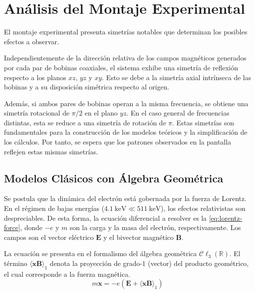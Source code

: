 \chapter{Análisis del Montaje Experimental}
\label{sec:analisis_montaje}

El montaje experimental presenta simetrías notables que determinan los
posibles efectos a observar.

Independientemente de la dirección relativa de los campos magnéticos
generados por cada par de bobinas coaxiales, el sistema exhibe una
simetría de reflexión respecto a los planos $xz$, $yz$ y $xy$.
Esto se debe a la simetría axial intrínseca de las bobinas y a su disposición
simétrica respecto al origen.

Además, si ambos pares de bobinas operan a la misma frecuencia, se
obtiene una simetría rotacional de $\pi/2$ en el plano $yz$.
En el caso general de frecuencias distintas, esta se reduce a una simetría de
rotación de $\pi$.
Estas simetrías son fundamentales para la construcción de los modelos teóricos
y la simplificación de los cálculos.
Por tanto, se espera que los patrones observados en la pantalla reflejen estas
mismas simetrías.

\section{Modelos Clásicos con Álgebra Geométrica}
\label{sec:modelo_clasico}

Se postula que la dinámica del electrón está gobernada por la fuerza de
Lorentz. En el régimen de bajas energías
($\qty{4.1}{\kilo\eV} \ll \qty{511}{\kilo\eV}$),
los efectos relativistas son despreciables. De esta forma, la ecuación
diferencial a resolver es la \cref{eq:lorentz-force}, donde $-e$ y $m$ son
la carga y la masa del electrón, respectivamente. Los campos son el
vector eléctrico $\boldsymbol{E}$ y el bivector magnético $\boldsymbol{B}$.

La ecuación se presenta en el formalismo del álgebra geométrica
$\mathcal{C}\ell_{3}(\mathbb{R})$. El término
$\langle \dot{\boldsymbol{x}} \boldsymbol{B} \rangle_{1}$ denota la
proyección de grado-1 (vector) del producto geométrico, el cual
corresponde a la fuerza magnética.
%
\begin{equation}
	m \ddot{\boldsymbol{x}} = -e \left( \boldsymbol{E}
	+ \langle \dot{\boldsymbol{x}} \boldsymbol{B} \rangle_{1} \right)
	\label{eq:lorentz-force}
\end{equation}

